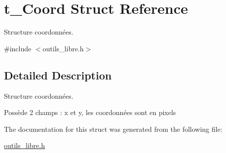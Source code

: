 \hypertarget{structt__Coord}{\section{t\-\_\-\-Coord Struct Reference}
\label{structt__Coord}
}


Structure coordonnées.  




{\ttfamily \#include $<$outils\-\_\-libre.\-h$>$}



\subsection{Detailed Description}
Structure coordonnées. 

Possède 2 champs \-: x et y, les coordonnées sont en pixels 

The documentation for this struct was generated from the following file\-:\begin{DoxyCompactItemize}
\item 
\hyperlink{outils__libre_8h}{outils\-\_\-libre.\-h}\end{DoxyCompactItemize}
